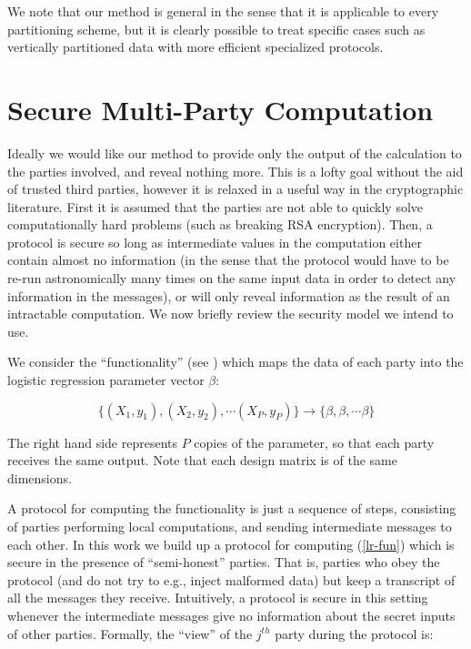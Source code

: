 \documentclass[11pt]{article}
\begin{document}
We note that our method is general in the sense that it is applicable to every partitioning scheme, but it is clearly possible to treat specific cases such as vertically partitioned data  with more efficient specialized protocols.


\section{Secure Multi-Party Computation}\label{sec:smpc}

Ideally we would like our method to provide only the output of the calculation to the parties involved, and reveal nothing more.  This is a lofty goal without the aid of trusted third parties, however it is relaxed in a useful way in the cryptographic literature.  First it is assumed that the parties are not able to quickly solve computationally hard problems (such as breaking RSA encryption).  Then, a protocol is secure so long as intermediate values in the computation either contain almost no information (in the sense that the protocol would have to be re-run astronomically many times on the same input data in order to detect any information in the messages), or will only reveal information as the result of an intractable computation.  We now briefly review the security model we intend to use.

We consider the ``functionality'' (see \cite{goldreich}) which maps the data of each party into the logistic regression parameter vector $\beta$:

\begin{equation}\label{lr-fun} \{(X_1,y_1),(X_2,y_2),\cdots (X_P,y_P)\} \rightarrow \{\beta, \beta, \cdots \beta \}
\end{equation}


The right hand side represents $P$ copies of the parameter, so that each party receives the same output.  Note that each design matrix is of the same dimensions.

A protocol for computing the functionality is just a sequence of steps, consisting of parties performing local computations, and sending intermediate messages to each other. In this work we build up a protocol for computing (\ref{lr-fun}) which is secure in the presence of ``semi-honest'' parties.  That is, parties who obey the protocol (and do not try to e.g., inject malformed data) but keep a transcript of all the messages they receive.  Intuitively, a protocol is secure in this setting whenever the intermediate messages give no information about the secret inputs of other parties.  Formally, the ``view'' of the $j^{th}$ party during the protocol is:
\end{document}
